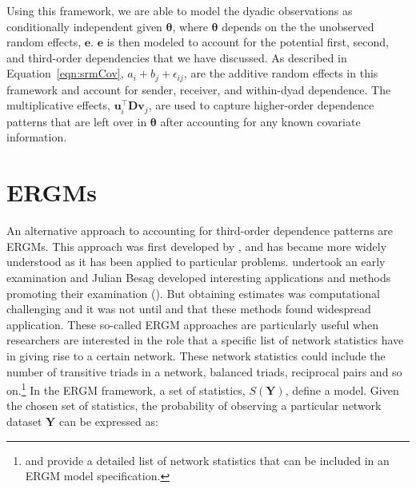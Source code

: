 \documentclass[12pt,pdflatex]{elsarticle}
\begin{document}
Using this framework, we are able to model the dyadic observations as conditionally independent given $\bm\theta$, where $\bm\theta$ depends on the the unobserved random effects, $\mathbf{e}$. $\mathbf{e}$ is then modeled to account for the potential first, second, and third-order dependencies that we have discussed. As described in Equation~\ref{eqn:srmCov}, $a_{i} + b_{j}  + \epsilon_{ij}$, are the additive random effects in this framework and account for sender, receiver, and within-dyad dependence. The multiplicative effects, $\textbf{u}_{i}^{\top} \textbf{D} \textbf{v}_{j}$, are used to capture higher-order dependence patterns that are left over in $\bm\theta$ after accounting for any known covariate information. %

\section*{\textbf{ERGMs}}

An alternative approach to accounting for third-order dependence patterns are ERGMs. This approach was first developed by \citet{erdos:renyi:1959}, and has became more widely understood as it has been applied to particular problems. \citet{frank:1971} undertook an early examination and Julian Besag developed interesting applications and methods promoting their examination (\citealt{besag:1977b}). But obtaining estimates was computational challenging and it was not until \citet{frank:strauss:1986} and \citet{wasserman:pattison:1996} that these methods found widespread application. These so-called ERGM approaches are particularly useful when researchers are interested in the role that a specific list of network statistics have in giving rise to a certain network. These network statistics could include the number of transitive triads in a network, balanced triads, reciprocal pairs and so on.\footnote{\citet{morris:etal:2008} and \citet{snijders:etal:2006} provide a detailed list of network statistics that can be included in an ERGM model specification.} In the ERGM framework, a set of statistics, $S(\mathbf{Y})$, define a model. Given the chosen set of statistics, the probability of observing a particular network dataset $\mathbf{Y}$ can be expressed as:
\end{document}
